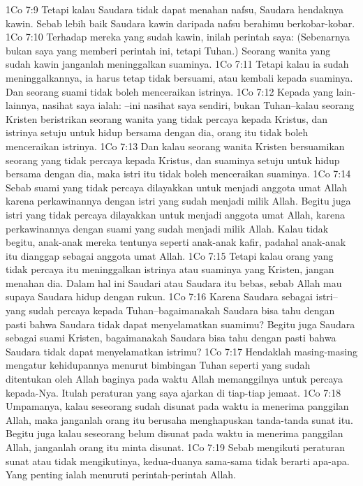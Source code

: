1Co 7:9  Tetapi kalau Saudara tidak dapat menahan nafsu, Saudara hendaknya kawin. Sebab lebih baik Saudara kawin daripada nafsu berahimu berkobar-kobar.
1Co 7:10  Terhadap mereka yang sudah kawin, inilah perintah saya: (Sebenarnya bukan saya yang memberi perintah ini, tetapi Tuhan.) Seorang wanita yang sudah kawin janganlah meninggalkan suaminya.
1Co 7:11  Tetapi kalau ia sudah meninggalkannya, ia harus tetap tidak bersuami, atau kembali kepada suaminya. Dan seorang suami tidak boleh menceraikan istrinya.
1Co 7:12  Kepada yang lain-lainnya, nasihat saya ialah: --ini nasihat saya sendiri, bukan Tuhan--kalau seorang Kristen beristrikan seorang wanita yang tidak percaya kepada Kristus, dan istrinya setuju untuk hidup bersama dengan dia, orang itu tidak boleh menceraikan istrinya.
1Co 7:13  Dan kalau seorang wanita Kristen bersuamikan seorang yang tidak percaya kepada Kristus, dan suaminya setuju untuk hidup bersama dengan dia, maka istri itu tidak boleh menceraikan suaminya.
1Co 7:14  Sebab suami yang tidak percaya dilayakkan untuk menjadi anggota umat Allah karena perkawinannya dengan istri yang sudah menjadi milik Allah. Begitu juga istri yang tidak percaya dilayakkan untuk menjadi anggota umat Allah, karena perkawinannya dengan suami yang sudah menjadi milik Allah. Kalau tidak begitu, anak-anak mereka tentunya seperti anak-anak kafir, padahal anak-anak itu dianggap sebagai anggota umat Allah.
1Co 7:15  Tetapi kalau orang yang tidak percaya itu meninggalkan istrinya atau suaminya yang Kristen, jangan menahan dia. Dalam hal ini Saudari atau Saudara itu bebas, sebab Allah mau supaya Saudara hidup dengan rukun.
1Co 7:16  Karena Saudara sebagai istri--yang sudah percaya kepada Tuhan--bagaimanakah Saudara bisa tahu dengan pasti bahwa Saudara tidak dapat menyelamatkan suamimu? Begitu juga Saudara sebagai suami Kristen, bagaimanakah Saudara bisa tahu dengan pasti bahwa Saudara tidak dapat menyelamatkan istrimu?
1Co 7:17  Hendaklah masing-masing mengatur kehidupannya menurut bimbingan Tuhan seperti yang sudah ditentukan oleh Allah baginya pada waktu Allah memanggilnya untuk percaya kepada-Nya. Itulah peraturan yang saya ajarkan di tiap-tiap jemaat.
1Co 7:18  Umpamanya, kalau seseorang sudah disunat pada waktu ia menerima panggilan Allah, maka janganlah orang itu berusaha menghapuskan tanda-tanda sunat itu. Begitu juga kalau seseorang belum disunat pada waktu ia menerima panggilan Allah, janganlah orang itu minta disunat.
1Co 7:19  Sebab mengikuti peraturan sunat atau tidak mengikutinya, kedua-duanya sama-sama tidak berarti apa-apa. Yang penting ialah menuruti perintah-perintah Allah.
